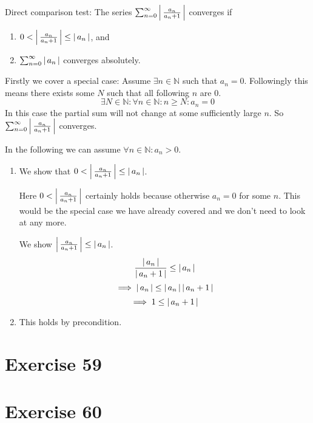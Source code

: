 \documentclass[a4paper]{article}
\theoremstyle{definition}
\newcommand\abs[1]{\left|\thinspace #1\thinspace\right|}
\begin{document}
Direct comparison test:
The series $\sum_{n=0}^\infty \abs{\frac{a_n}{a_n + 1}}$ converges if
\begin{enumerate}
  \item $0 < \abs{\frac{a_n}{a_{n} + 1}} \leq \abs{a_n}$, and
  \item $\sum_{n=0}^\infty \abs{a_n}$ converges absolutely.
\end{enumerate}

\begin{mdframed}
  Firstly we cover a special case: Assume $\exists n \in \mathbb N$ such that $a_n = 0$.
  Followingly this means there exists some $N$ such that all following $n$ are $0$.
  \[ \exists N \in \mathbb N: \forall n \in \mathbb N: n \geq N: a_n = 0 \]
  In this case the partial sum will not change at some sufficiently large $n$.
  So $\sum_{n=0}^\infty \abs{\frac{a_n}{a_n + 1}}$ converges.

  In the following we can assume $\forall n \in \mathbb N: a_n > 0$.
\end{mdframed}

\begin{enumerate}
  \item We show that $0 < \abs{\frac{a_n}{a_n + 1}} \leq \abs{a_n}$.

    Here $0 < \abs{\frac{a_n}{a_n + 1}}$ certainly holds because otherwise $a_n = 0$
    for some $n$. This would be the special case we have already covered and
    we don't need to look at any more.

    We show $\abs{\frac{a_n}{a_n + 1}} \leq \abs{a_n}$.
    \[ \frac{\abs{a_n}}{\abs{a_n + 1}} \leq \abs{a_n} \]
    \[ \implies \abs{a_n} \leq \abs{a_n} \abs{a_n + 1} \]
    \[ \implies 1 \leq \abs{a_n + 1} \]

  \item This holds by precondition.
\end{enumerate}

\section{Exercise 59}


\section{Exercise 60}
\end{document}
